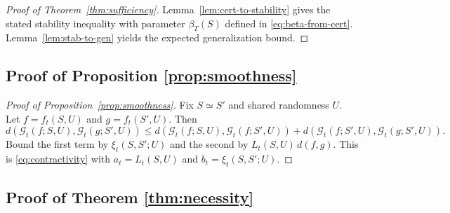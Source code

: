 \documentclass{article}
\numberwithin{equation}{section}
\begin{document}
\begin{proof}[Proof of Theorem~\ref{thm:sufficiency}]
	Lemma~\ref{lem:cert-to-stability} gives the stated stability inequality with parameter $\beta_T(S)$ defined in \eqref{eq:beta-from-cert}.
	Lemma~\ref{lem:stab-to-gen} yields the expected generalization bound.
\end{proof}

\subsection{Proof of Proposition \ref{prop:smoothness}}
\label{app:proof-smoothness}

\begin{proof}[Proof of Proposition~\ref{prop:smoothness}]
	Fix $S\simeq S'$ and shared randomness $U$.
	Let $f=f_t(S,U)$ and $g=f_t(S',U)$.
	Then
	\[
	d(\mathcal{G}_t(f;S,U),\mathcal{G}_t(g;S',U))
	\le
	d(\mathcal{G}_t(f;S,U),\mathcal{G}_t(f;S',U))
	+
	d(\mathcal{G}_t(f;S',U),\mathcal{G}_t(g;S',U)).
	\]
	Bound the first term by $\xi_t(S,S';U)$ and the second by $L_t(S,U)\,d(f,g)$.
	This is \eqref{eq:contractivity} with $a_t=L_t(S,U)$ and $b_t=\xi_t(S,S';U)$.
\end{proof}

\subsection{Proof of Theorem \ref{thm:necessity}}
\label{app:proof-necessity}
\end{document}
